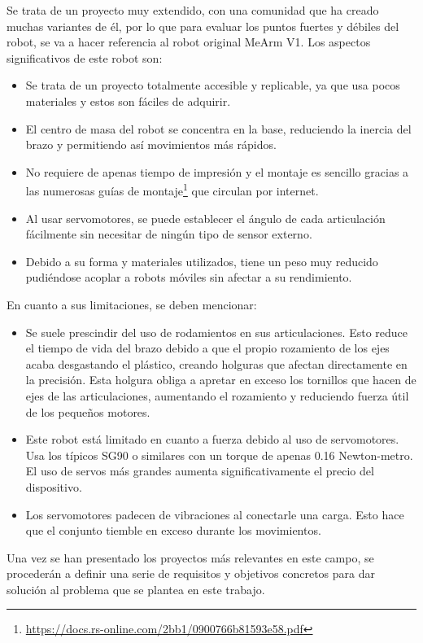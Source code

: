     Se trata de un proyecto muy extendido, con una comunidad que ha creado muchas variantes de él, por lo que para evaluar los puntos fuertes y 
    débiles del robot, se va a hacer referencia al robot original MeArm V1.
    Los aspectos significativos de este robot son:
    \begin{itemize}
        \item Se trata de un proyecto totalmente accesible y replicable, ya que usa pocos materiales y estos son fáciles de adquirir.
        \item El centro de masa del robot se concentra en la base, reduciendo la inercia del brazo y permitiendo así movimientos más rápidos.
        \item No requiere de apenas tiempo de impresión y el montaje es sencillo gracias a las numerosas guías de 
        montaje\footnote{\url{https://docs.rs-online.com/2bb1/0900766b81593e58.pdf}} que circulan por internet.
        \item Al usar servomotores, se puede establecer el ángulo de cada articulación fácilmente sin necesitar de ningún tipo de sensor externo.
        \item Debido a su forma y materiales utilizados, tiene un peso muy reducido pudiéndose acoplar a robots móviles sin afectar a 
        su rendimiento.
    \end{itemize}
    En cuanto a sus limitaciones, se deben mencionar:
    \begin{itemize}
    \item Se suele prescindir del uso de rodamientos en sus articulaciones. Esto reduce el tiempo de vida del brazo debido a que el propio rozamiento 
    de los ejes acaba desgastando el plástico, creando holguras que afectan directamente en la precisión. Esta holgura obliga a apretar en exceso los tornillos 
    que hacen de ejes de las articulaciones, aumentando el rozamiento y reduciendo fuerza útil de los pequeños motores.
    \item Este robot está limitado en cuanto a fuerza debido al uso de servomotores. Usa los típicos SG90 o similares con un torque de apenas 
    0.16 Newton-metro. El uso de servos más grandes aumenta significativamente el precio del dispositivo. 
    \item Los servomotores padecen de vibraciones al conectarle una carga. Esto hace que el conjunto tiemble en exceso durante los movimientos.
    \end{itemize}

\noindent Una vez se han presentado los proyectos más relevantes en este campo, se procederán a definir una serie 
de requisitos y objetivos concretos para dar solución al problema que se plantea en este trabajo.
